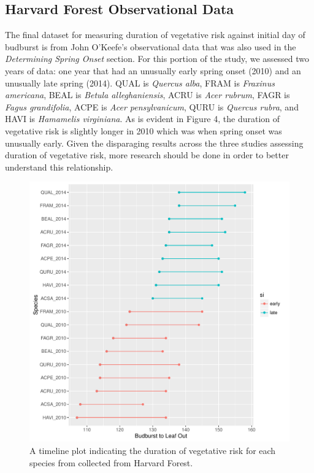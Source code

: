 \documentclass{article}\usepackage[]{graphicx}\usepackage[]{color}
\makeatletter
\def\maxwidth{ %
  \ifdim\Gin@nat@width>\linewidth
    \linewidth
  \else
    \Gin@nat@width
  \fi
}
\makeatother
\begin{document}
\subsection{Harvard Forest Observational Data}
The final dataset for measuring duration of vegetative risk against initial day of budburst is from John O'Keefe's observational data that was also used in the \textit{Determining Spring Onset} section. For this portion of the study, we assessed two years of data: one year that had an unusually early spring onset (2010) and an unusually late spring (2014). QUAL is \textit{Quercus alba}, FRAM is \textit{Fraxinus americana}, BEAL is \textit{Betula alleghaniensis}, ACRU is \textit{Acer rubrum}, FAGR is \textit{Fagus grandifolia}, ACPE is \textit{Acer pensylvanicum}, QURU is \textit{Quercus rubra}, and HAVI is \textit{Hamamelis virginiana}. As is evident in Figure 4, the duration of vegetative risk is slightly longer in 2010 which was when spring onset was unusually early. Given the disparaging results across the three studies assessing duration of vegetative risk, more research should be done in order to better understand this relationship. 

\begin{figure}[H]
\includegraphics[width=\maxwidth]{figure/forest-1} \caption[A timeline plot indicating the duration of vegetative risk for each species from collected from Harvard Forest]{A timeline plot indicating the duration of vegetative risk for each species from collected from Harvard Forest.}\label{fig:forest}
\end{figure}
\end{document}
